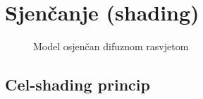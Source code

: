 \section{Sjenčanje (shading)}

\begin{figure}[H]
\label{fig:monkey-plastic}
\begin{center}
\caption{Model osjenčan difuznom rasvjetom}
\end{center}
\end{figure}

\subsection{Cel-shading princip}

